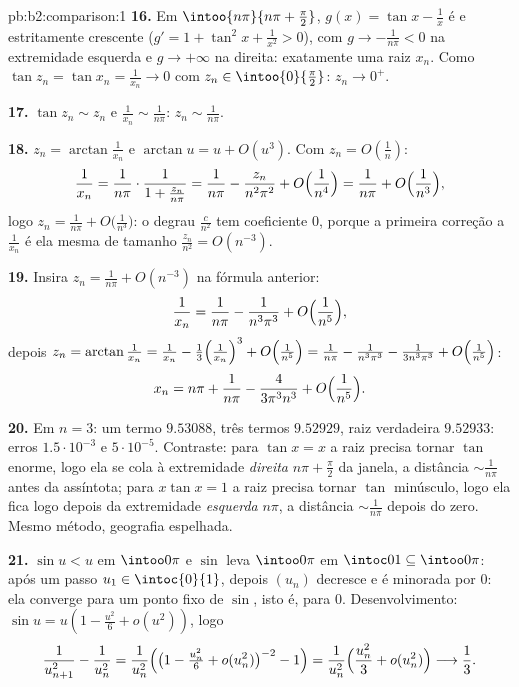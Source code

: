 \begin{solution}{pb:b2:comparison:1}
\textbf{16.} Em $\intoo{n\pi}{n\pi + \frac\pi2}$, $g(x) = \tan
x - \frac1x$ é  e estritamente crescente ($g' = 1 +
\tan^2x + \frac1{x^2} > 0$), com $g \to -\frac1{n\pi} < 0$ na
extremidade esquerda e $g \to +\infty$ na direita: exatamente uma
raiz $x_n$. Como $\tan z_n = \tan x_n = \frac1{x_n} \to 0$
com $z_n \in \intoo{0}{\frac\pi2}$: $z_n \to 0^+$.

\textbf{17.} $\tan z_n \sim z_n$ e $\frac1{x_n} \sim
\frac1{n\pi}$: $z_n \sim \frac1{n\pi}$.

\textbf{18.} $z_n = \arctan\frac1{x_n}$ e $\arctan u = u +
O(u^3)$. Com $z_n = O(\frac1n)$:
\[
\frac1{x_n} = \frac{1}{n\pi}\cdot\frac1{1 + \frac{z_n}{n\pi}}
= \frac1{n\pi} - \frac{z_n}{n^2\pi^2} +
O\Bigl(\frac1{n^4}\Bigr)
= \frac1{n\pi} + O\Bigl(\frac1{n^3}\Bigr),
\]
logo $z_n = \frac1{n\pi} + O\bigl(\frac1{n^3}\bigr)$: o
degrau $\frac{c}{n^2}$ tem coeficiente $0$, porque a
primeira correção a $\frac1{x_n}$ é ela mesma de tamanho
$\frac{z_n}{n^2} = O(n^{-3})$.

\textbf{19.} Insira $z_n = \frac1{n\pi} + O(n^{-3})$ na
fórmula anterior:
\[
\frac{1}{x_n} = \frac{1}{n\pi} - \frac{1}{n^3\pi^3} +
O\Bigl(\frac1{n^5}\Bigr),
\]
depois $z_n = \arctan\frac1{x_n} = \frac1{x_n} -
\frac{1}{3}\Bigl(\frac1{x_n}\Bigr)^3 + O\Bigl(\frac1{n^5}\Bigr)
= \frac1{n\pi} - \frac{1}{n^3\pi^3} - \frac{1}{3n^3\pi^3} +
O\Bigl(\frac1{n^5}\Bigr)$:
\[
x_n = n\pi + \frac{1}{n\pi} - \frac{4}{3\pi^3n^3} +
O\Bigl(\frac1{n^5}\Bigr).
\]

\textbf{20.} Em $n = 3$: um termo $9.53088$, três termos
$9.52929$, raiz verdadeira $9.52933$: erros $1.5\cdot10^{-3}$ e
$5\cdot10^{-5}$. Contraste: para $\tan x = x$ a raiz precisa tornar
$\tan$ enorme, logo ela se cola à extremidade \emph{direita} $n\pi +
\frac\pi2$ da janela, a distância $\sim\frac1{n\pi}$
antes da assíntota; para $x\tan x = 1$ a raiz precisa tornar
$\tan$ minúsculo, logo ela fica logo depois da extremidade \emph{esquerda} $n\pi$,
a distância $\sim\frac1{n\pi}$ depois do zero. Mesmo método,
geografia espelhada.

\textbf{21.} $\sin u < u$ em $\intoo0\pi$ e $\sin$ leva
$\intoo0\pi$ em $\intoc01 \subseteq \intoo0\pi$: após um
passo $u_1 \in \intoc{0}{1}$, depois $(u_n)$ decresce e é
minorada por $0$: ela converge para um ponto fixo de $\sin$,
isto é, para $0$. Desenvolvimento: $\sin u = u(1 - \frac{u^2}6 +
o(u^2))$, logo
\[
\frac{1}{u_{n+1}^2} - \frac1{u_n^2}
= \frac{1}{u_n^2}\Bigl(\bigl(1 - \tfrac{u_n^2}6 +
o(u_n^2)\bigr)^{-2} - 1\Bigr)
= \frac{1}{u_n^2}\Bigl(\frac{u_n^2}{3} + o(u_n^2)\Bigr)
\longrightarrow \frac13 .
\]


\end{solution}
